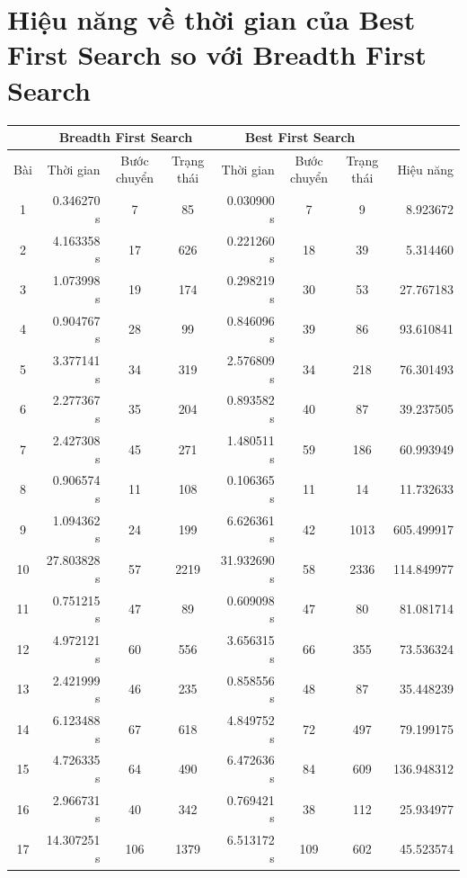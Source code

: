 \documentclass[a4paper]{article}
\begin{document}
\section {Hiệu năng về thời gian của Best First Search so với Breadth First Search }
\begin{center}
	\begin{tabular}{|c|r|c|c|r|c|c|r|}
		\hline
		& \multicolumn{3}{|c|}{Breadth First Search} & \multicolumn{3}{|c|}{Best First Search} & \\
		\hline
		Bài & Thời gian  & Bước chuyển & Trạng thái & Thời gian & Bước chuyển & Trạng thái & Hiệu năng\\ \hline
		1   & 0.346270 s	& 7		& 85	& 0.030900 s	& 7		& 9 	& 8.923672 \\ \hline
		2   & 4.163358 s	& 17	& 626	& 0.221260 s	& 18	& 39	& 5.314460 \\ \hline
		3	& 1.073998 s	& 19	& 174	& 0.298219 s	& 30	& 53	& 27.767183 \\ \hline
		4 	& 0.904767 s	& 28	& 99	& 0.846096 s	& 39	& 86	& 93.610841 \\ \hline
		5	& 3.377141 s	& 34	& 319	& 2.576809 s	& 34	& 218	& 76.301493 \\ \hline
		6	& 2.277367 s	& 35	& 204	& 0.893582 s	& 40	& 87	& 39.237505 \\ \hline
		7	& 2.427308 s	& 45	& 271	& 1.480511 s	& 59	& 186	& 60.993949 \\ \hline
		8	& 0.906574 s	& 11	& 108	& 0.106365 s	& 11	& 14	& 11.732633 \\ \hline
		9	& 1.094362 s	& 24	& 199	& 6.626361 s	& 42	& 1013	& 605.499917 \\ \hline
		10	& 27.803828 s	& 57	& 2219	& 31.932690 s	& 58	& 2336	& 114.849977 \\ \hline
		11	& 0.751215 s	& 47	& 89	& 0.609098 s	& 47	& 80	& 81.081714 \\ \hline
		12	& 4.972121 s	& 60	& 556	& 3.656315 s	& 66	& 355	& 73.536324 \\ \hline
		13	& 2.421999 s	& 46	& 235	& 0.858556 s	& 48	& 87	& 35.448239 \\ \hline
		14	& 6.123488 s	& 67	& 618	& 4.849752 s	& 72	& 497	& 79.199175 \\ \hline
		15	& 4.726335 s	& 64	& 490	& 6.472636 s	& 84	& 609	& 136.948312 \\ \hline
		16	& 2.966731 s	& 40	& 342	& 0.769421 s	& 38	& 112	& 25.934977 \\ \hline
		17	& 14.307251 s	& 106	& 1379	& 6.513172 s	& 109	& 602	& 45.523574 \\ \hline

\end{tabular}
\end{center}
\end{document}
